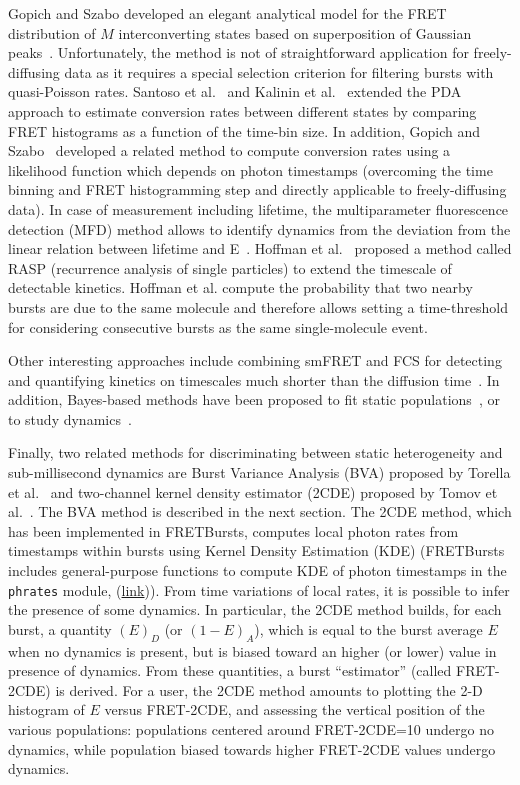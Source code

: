 \documentclass[10pt,letterpaper]{article}
\begin{document}
Gopich and Szabo developed an elegant analytical model 
for the FRET distribution of $M$ interconverting states  
based on superposition of Gaussian peaks~\cite{gopich_fret_2010}.
Unfortunately, the method is not of straightforward application for 
freely-diffusing data as it requires a special selection 
criterion for filtering bursts with quasi-Poisson rates.
Santoso et al.~\cite{santoso_probing_2009} and Kalinin et al.~\cite{Kalinin2010}
extended the PDA approach to estimate conversion rates between different
states by comparing FRET histograms as a function of the time-bin size.
In addition, Gopich and Szabo~\cite{Gopich2009, gopich_theory_2011} developed
a related method to compute conversion rates using
a likelihood function which depends on photon timestamps (overcoming
the time binning and FRET histogramming step and directly applicable 
to freely-diffusing data).
In case of measurement including lifetime, the multiparameter fluorescence
detection (MFD) method allows to identify dynamics from the deviation 
from the linear relation between lifetime and E~\cite{Sisamakis_2010}.
Hoffman et al.~\cite{hoffmann_quantifying_2011} proposed a method 
called RASP (recurrence analysis of single particles) to extend 
the timescale of detectable kinetics.
Hoffman et al. compute the probability that two nearby bursts are due to
the same molecule and therefore allows setting a time-threshold
for considering consecutive bursts as the same single-molecule event.

Other interesting approaches include combining smFRET and FCS 
for detecting and quantifying kinetics on timescales much shorter 
than the diffusion 
time~\cite{laurence_correlation_2007,torres_measuring_2007,nettels_unfolded_2008}.
In addition, Bayes-based methods have been proposed to fit static
populations~\cite{devore_classic_2012,murphy_bayesian_2014}, or to study dynamics~\cite{kou_bayesian_2005}.

Finally, two related methods for discriminating between static heterogeneity
and sub-millisecond dynamics are Burst Variance Analysis
(BVA) proposed by Torella et al.~\cite{Torella_2011} and
two-channel kernel density estimator (2CDE) proposed by 
Tomov et al.~\cite{Tomov_2012}. The BVA method is described in the next section.
The 2CDE method, which has been implemented in FRETBursts, computes local
photon rates from timestamps within bursts using
Kernel Density Estimation (KDE)
(FRETBursts includes general-purpose functions
to compute KDE of photon timestamps in the \verb|phrates| module, 
(\href{http://fretbursts.readthedocs.io/en/latest/phrates.html}{link})).
From time variations of local rates, it is possible to
infer the presence of some dynamics. In particular, the 2CDE method
builds, for each burst, a quantity $(E)_D$ (or $(1-E)_A$), which is equal 
to the burst average $E$ when no dynamics is present, but is biased 
toward an higher (or lower) value in presence of dynamics. From these
quantities, a burst ``estimator'' 
(called FRET-2CDE) is derived. For a user, the 2CDE method amounts
to plotting the 2-D histogram of $E$ versus FRET-2CDE, and assessing the vertical position of the various populations: 
populations centered around FRET-2CDE=10 undergo
no dynamics, while population biased towards higher FRET-2CDE values 
undergo dynamics.
\end{document}
